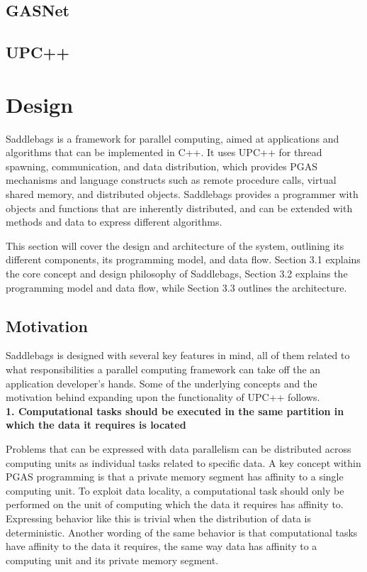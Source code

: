 \documentclass{uit-report}
\begin{document}
\subsection{GASNet}

\subsection{UPC++}

\newpage
\section{Design}
Saddlebags is a framework for parallel computing, aimed at applications and algorithms that can be implemented in C++. It uses UPC++ for thread spawning, communication, and data distribution, which provides PGAS mechanisms and language constructs such as remote procedure calls, virtual shared memory, and distributed objects. Saddlebags provides a programmer with objects and functions that are inherently distributed, and can be extended with methods and data to express different algorithms.

This section will cover the design and architecture of the system, outlining its different components, its programming model, and data flow. Section 3.1 explains the core concept and design philosophy of Saddlebags, Section 3.2 explains the programming model and data flow, while Section 3.3 outlines the architecture.

\subsection{Motivation}
Saddlebags is designed with several key features in mind, all of them related to what responsibilities a parallel computing framework can take off the an application developer's hands. Some of the underlying concepts and the motivation behind expanding upon the functionality of UPC++ follows.
\\


\hspace{4ex} \textbf{1. Computational tasks should be executed in the same partition in which the data it requires is located}

Problems that can be expressed with data parallelism \cite{data_parallelism} can be distributed across computing units as individual tasks related to specific data. A key concept within PGAS programming is that a private memory segment has affinity to a single computing unit. To exploit data locality, a computational task should only be performed on the unit of computing which the data it requires has affinity to. Expressing behavior like this is trivial when the distribution of data is deterministic. Another wording of the same behavior is that computational tasks have affinity to the data it requires, the same way data has affinity to a computing unit and its private memory segment.
\\
\end{document}
